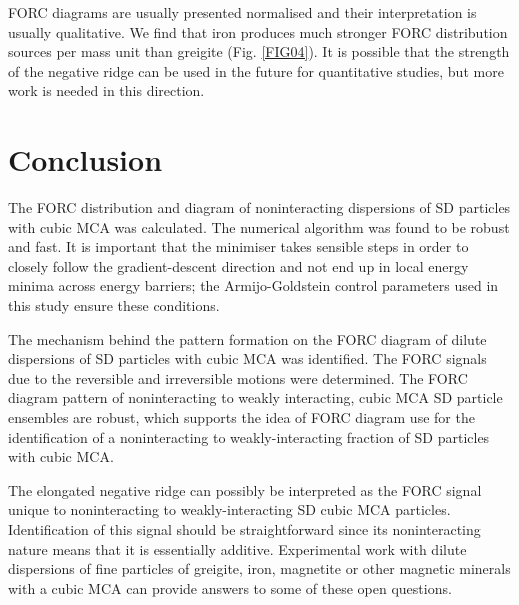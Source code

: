 FORC diagrams are usually presented normalised and their interpretation is usually qualitative. We find that iron produces much stronger FORC distribution sources per mass unit than greigite (Fig. \ref{FIG04}). It is possible that the strength of the negative ridge can be used in the future for quantitative studies, but more work is needed in this direction.\par

\section{Conclusion}
The FORC distribution and diagram of noninteracting dispersions of SD particles with cubic MCA was calculated. The numerical algorithm was found to be robust and fast. It is important that the minimiser takes sensible steps in order to closely follow the gradient-descent direction and not end up in local energy minima across energy barriers; the Armijo-Goldstein control parameters used in this study ensure these conditions.\par

The mechanism behind the pattern formation on the FORC diagram of dilute dispersions of SD particles with cubic MCA was identified. The FORC signals due to the reversible and irreversible motions were determined. The FORC diagram pattern of noninteracting to weakly interacting, cubic MCA SD particle ensembles are robust, which supports the idea of FORC diagram use for the identification of a noninteracting to weakly-interacting fraction of SD particles with cubic MCA.\par

The elongated negative ridge can possibly be interpreted as the FORC signal unique to noninteracting to weakly-interacting SD cubic MCA particles. Identification of this signal should be straightforward since its noninteracting nature means that it is essentially additive. Experimental work with dilute dispersions of fine particles of greigite, iron, magnetite or other magnetic minerals with a cubic MCA can provide answers to some of these open questions.\par

\renewcommand\bibname{{References}}



